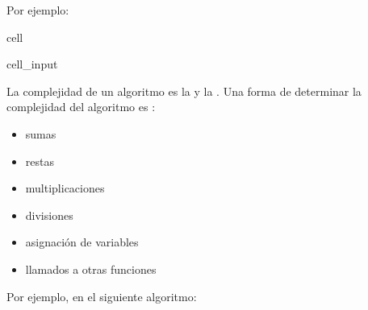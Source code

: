 \documentclass[letterpaper,10pt,english]{jupyterBook}
\begin{document}
\sphinxAtStartPar
Por ejemplo:

\begin{sphinxuseclass}{cell}\begin{sphinxVerbatimInput}

\begin{sphinxuseclass}{cell_input}
\begin{sphinxVerbatim}[commandchars=\\\{\}]
 
      
       
           
              
     
\end{sphinxVerbatim}

\end{sphinxuseclass}\end{sphinxVerbatimInput}

\end{sphinxuseclass}
\sphinxAtStartPar
La complejidad de un algoritmo es la  y la .
Una forma de determinar la complejidad del algoritmo es :
\begin{itemize}
\item {} 
\sphinxAtStartPar
sumas

\item {} 
\sphinxAtStartPar
restas

\item {} 
\sphinxAtStartPar
multiplicaciones

\item {} 
\sphinxAtStartPar
divisiones

\item {} 
\sphinxAtStartPar
asignación de variables

\item {} 
\sphinxAtStartPar
llamados a otras funciones

\end{itemize}

\sphinxAtStartPar
Por ejemplo, en el siguiente algoritmo:
\end{document}
